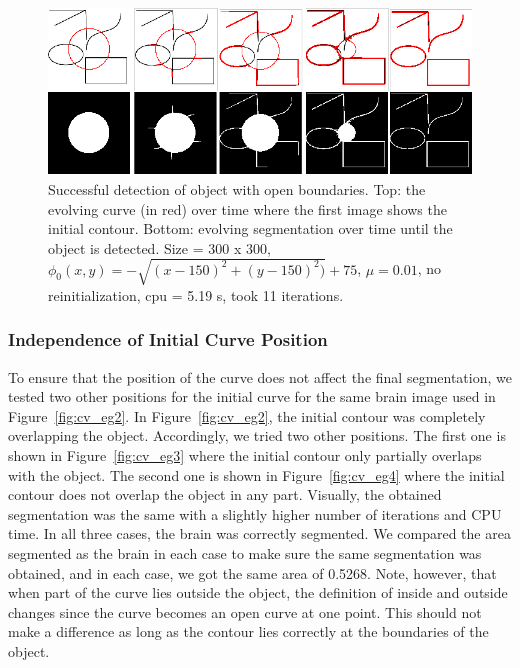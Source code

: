\documentclass[10pt,journal,letterpaper,compsoc]{IEEEtran}
\begin{document}
\begin{figure}[t]
\centering
\includegraphics[width=12cm]{cv_eg8.png}
\caption{Successful detection of object with open boundaries. Top: the evolving curve (in red) over time where the first image shows the initial contour.
Bottom: evolving segmentation over time until the object is detected. Size = 300 x 300, $\phi_{0}(x,y) = - \sqrt{(x - 150)^2 + (y - 150)^2)} + 75$, $\mu =
0.01$, no reinitialization, cpu = 5.19 s, took 11 iterations.}
\label{fig:cv_eg8}
\end{figure}


\subsubsection*{Independence of Initial Curve Position}

To ensure that the position of the curve does not affect the final segmentation, we tested two other positions for the initial curve for the same brain image
used in Figure~\ref{fig:cv_eg2}. In Figure~\ref{fig:cv_eg2}, the initial contour was completely overlapping the object. Accordingly, we tried two other
positions. The first one is shown in Figure~\ref{fig:cv_eg3} where the initial contour only partially overlaps with the object. The second one is shown in
Figure~\ref{fig:cv_eg4} where the initial contour does not overlap the object in any part. Visually, the obtained segmentation was the same with a slightly
higher number of iterations and CPU time. In all three cases, the brain was correctly segmented. We compared the area segmented as the brain in each case to
make sure the same segmentation was obtained, and in each case, we got the same area of 0.5268. Note, however, that when part of the curve lies outside the
object, the definition of inside and outside changes since the curve becomes an open curve at one point. This should not make a difference as long as the
contour lies correctly at the boundaries of the object. 
\end{document}
